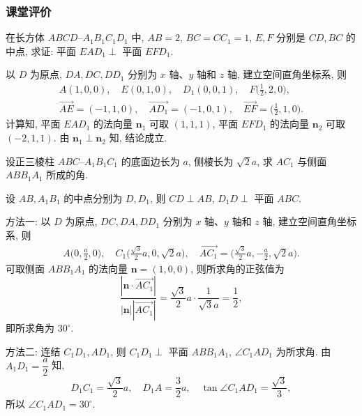 
\subsubsection{课堂评价}
\begin{exercise}
    在长方体 $ABCD\text{--}A_1B_1C_1D_1$ 中, $AB=2$, $BC=CC_1= 1$, $E,F$ 分别是 $CD, BC$ 的中点, 求证: 平面 $EAD_1\perp$ 平面 $EFD_1$.
\end{exercise}
\beginsolution
    以 $D$ 为原点, $DA, DC, DD_1$ 分别为 $x$ 轴、$y$ 轴和 $z$ 轴, 建立空间直角坐标系, 则
    \[\begin{gathered}
        A(1,0,0),\quad E(0,1,0),\quad 
        D_1(0,0,1),\quad F\biggl(\frac12,2,0\biggr),\\
        \overrightarrow{AE}= (-1,1,0),\quad
        \overrightarrow{AD_1}= (-1,0,1),\quad
        \overrightarrow{EF}= \biggl(\frac12,1,0\biggr).
    \end{gathered}\]
    计算知, 平面 $EAD_1$ 的法向量 $\bm{n}_1$ 可取 $(1,1,1)$, 平面 $EFD_1$ 的法向量 $\bm{n}_2$ 可取 $(-2,1,1)$. 由 $\bm{n}_1\perp \bm{n}_2$ 知, 结论成立.
\endsolution

\begin{exercise}
    设正三棱柱 $ABC\text{--}A_1B_1C_1$ 的底面边长为 $a$, 侧棱长为 $\sqrt2a$, 求 $AC_1$ 与侧面 $ABB_1A_1$ 所成的角.
\end{exercise}
\beginsolution
    设 $AB, A_1B_1$ 的中点分别为 $D,D_1$, 则 $CD\perp AB$, $D_1D\perp$ 平面 $ABC$.

    方法一: 以 $D$ 为原点, $DC, DA, DD_1$ 分别为 $x$ 轴、$y$ 轴和 $z$ 轴, 建立空间直角坐标系, 则
    \[\begin{gathered}
        A\biggl(0,\frac{a}2,0\biggr),\quad 
        C_1\biggl(\frac{\sqrt3}2 a,0, \sqrt2a\biggr),\quad
        \overrightarrow{AC_1}
        = \biggl(\frac{\sqrt3}2a,-\frac{a}2,\sqrt2 a\biggr).
    \end{gathered}\]
    可取侧面 $ABB_1A_1$ 的法向量 $\bm{n}= (1,0,0)$, 则所求角的正弦值为
    \[\frac{|\bm{n}\cdot \overrightarrow{AC_1}|}{
        |\bm{n}| |\overrightarrow{AC_1}|}
    = \frac{\sqrt3}{2}a\cdot \frac{1}{\sqrt3a}
    = \frac12,\]
    即所求角为 $30^\circ$.

    方法二: 连结 $C_1D_1, AD_1$, 则 $C_1D_1\perp$ 平面 $ABB_1A_1$, $\angle C_1AD_1$ 为所求角. 由 $A_1D_1= \dfrac{a}2$ 知,
    \[D_1C_1= \frac{\sqrt3}2 a,\quad D_1A= \frac32 a,\quad
    \tan\angle C_1AD_1= \frac{\sqrt3}{3},\]
    所以 $\angle C_1AD_1= 30^\circ$.
\endsolution
    
